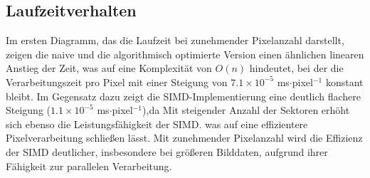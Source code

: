 \documentclass[course=erap]{aspdoc}
\begin{document}
\subsection{Laufzeitverhalten}

Im ersten Diagramm, das die Laufzeit bei zunehmender Pixelanzahl darstellt, zeigen die naive und die algorithmisch optimierte Version einen ähnlichen linearen Anstieg der Zeit, was auf eine Komplexität von \( O(n) \) hindeutet, bei der die Verarbeitungszeit pro Pixel mit einer Steigung von \( 7.1 \times 10^{-5} \) ms\(\cdot\)pixel\(^{-1}\) konstant bleibt. Im Gegensatz dazu zeigt die SIMD-Implementierung eine deutlich flachere Steigung (\( 1.1 \times 10^{-5} \) ms\(\cdot\)pixel\(^{-1}\)),da Mit steigender Anzahl der Sektoren erhöht sich ebenso die Leistungsfähigkeit der SIMD. was auf eine effizientere Pixelverarbeitung schließen lässt. Mit zunehmender Pixelanzahl wird die Effizienz der SIMD deutlicher, insbesondere bei größeren Bilddaten, aufgrund ihrer Fähigkeit zur parallelen Verarbeitung.
\end{document}
